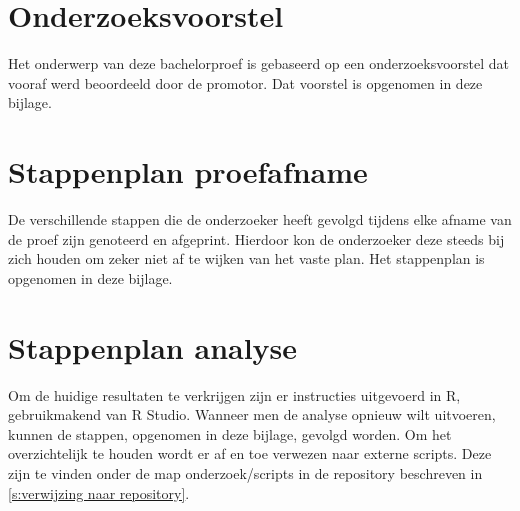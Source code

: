 \documentclass[fleqn,a4paper,12pt]{book}
\begin{document}
\chapter{Onderzoeksvoorstel}
\label{apendix:onderzoeksvoorstel}
Het onderwerp van deze bachelorproef is gebaseerd op een onderzoeksvoorstel dat vooraf werd beoordeeld door de promotor. Dat voorstel is opgenomen in deze bijlage.



\chapter{Stappenplan proefafname}
\label{appendix:stappenplan proefafname}

De verschillende stappen die de onderzoeker heeft gevolgd tijdens elke afname van de proef zijn genoteerd en afgeprint. Hierdoor kon de onderzoeker deze steeds bij zich houden om zeker niet af te wijken van het vaste plan. Het stappenplan is opgenomen in deze bijlage.



\chapter{Stappenplan analyse}
\label{appendix:stappenplan analyse}

Om de huidige resultaten te verkrijgen zijn er instructies uitgevoerd in R, gebruikmakend van R Studio. Wanneer men de analyse opnieuw wilt uitvoeren, kunnen de stappen, opgenomen in deze bijlage, gevolgd worden. Om het overzichtelijk te houden wordt er af en toe verwezen naar externe scripts. Deze zijn te vinden onder de map onderzoek/scripts in de repository beschreven in \ref{s:verwijzing naar repository}.



\printbibliography[heading=bibintoc]
\end{document}
